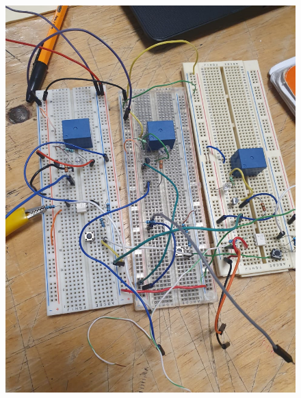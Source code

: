 \documentclass[10pt,a4paper]{article}
\begin{document}
\begin{figure}[hbtp]
\centering
\includegraphics[scale=0.30]{001.png} 
\end{figure}
\end{document}
